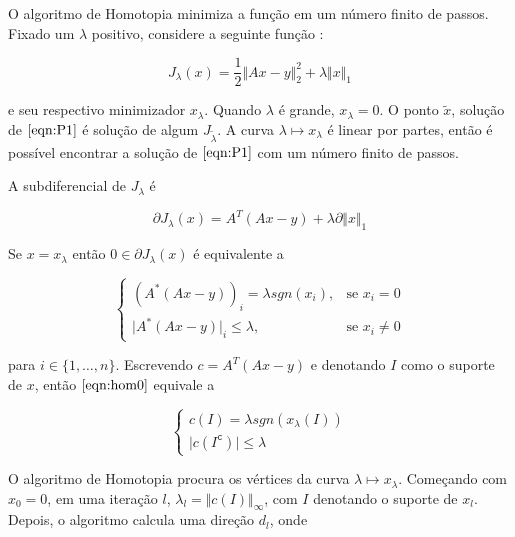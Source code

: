 
O algoritmo de Homotopia \cite{fornasier} \cite{dontsa} minimiza a função em um número finito de passos. Fixado um $\lambda$ positivo, considere a seguinte função :

$$J_{\lambda} (x) = \frac{1}{2} \Vert Ax - y \Vert_2^2 + \lambda \Vert x \Vert_1$$

e seu respectivo minimizador $x_\lambda$. Quando $\lambda$ é grande, $x_{\lambda} = 0$. O ponto $\tilde{x}$, solução de $\eqref{eqn:P1}$ é solução de algum $J_{\tilde{\lambda}}$. A curva $\lambda \longmapsto x_{\lambda}$ é linear por partes, então é possível encontrar a solução de $\eqref{eqn:P1}$ com um número finito de passos.

A subdiferencial de $J_\lambda$ é

$$\partial J_\lambda(x) = A^{T}(Ax - y) + \lambda \partial \Vert x \Vert_1$$

Se $x = x_\lambda$ então $0 \in \partial J_\lambda(x)$ é equivalente a

\begin{equation}
\begin{cases}
(A^*(Ax - y))_i           =    \lambda sgn(x_i), &\mbox{se } x_i = 0\\
\vert A^*(Ax - y)\vert_i  \leq \lambda,          &\mbox{se } x_i \neq 0
\end{cases}
\label{eqn:hom0}
\end{equation}

para $i \in \{1, \hdots, n \}$. Escrevendo $c = A^{T}(Ax - y)$ e denotando $I$ como o suporte de $x$, então $\eqref{eqn:hom0}$ equivale a

\begin{equation}
\begin{cases}
c(I)           =    \lambda sgn(x_{\lambda}(I)) \\
\vert c(I^{\texttt{c}}) \vert \leq \lambda
\end{cases}
\label{eqn:hom1}
\end{equation}

O algoritmo de Homotopia procura os vértices da curva $\lambda \longmapsto x_\lambda$. Começando com $x_0 = 0$, em uma iteração $l$, $\lambda_l = \Vert c(I) \Vert_{\infty}$, com $I$ denotando o suporte de $x_l$. Depois, o algoritmo calcula uma direção $d_l$, onde

